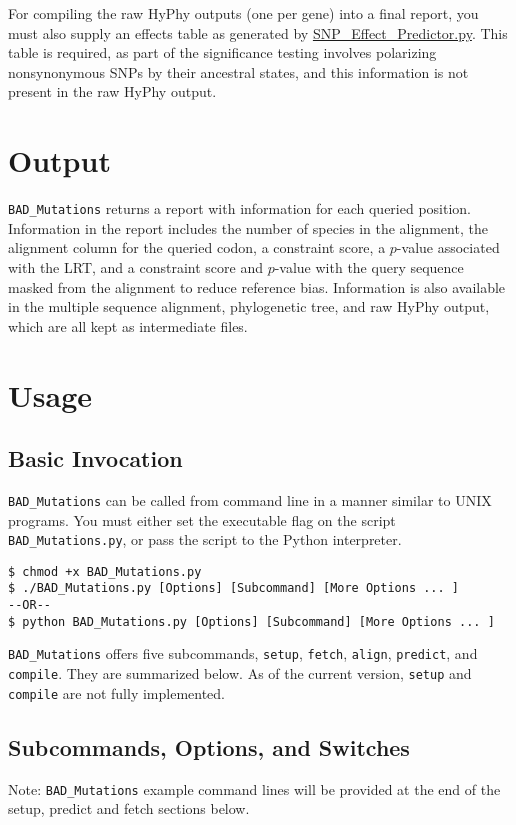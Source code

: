 \documentclass[12pt]{article}
\newcommand{\BM}{\texttt{BAD\_Mutations} }
\begin{document}
\par For compiling the raw HyPhy outputs (one per gene) into a final report,
you must also supply an effects table as generated by
\href{https://raw.githubusercontent.com/TomJKono/Misc_Utils/master/SNP_Effect_Predictor.py}
{SNP\_Effect\_Predictor.py}.
This table is required, as part of the significance testing involves polarizing
nonsynonymous SNPs by their ancestral states, and this information is not
present in the raw HyPhy output.

\section*{Output}
\par \BM returns a report with information for each queried position.
Information in the report includes the number of species in the alignment,
the alignment column for the queried codon, a constraint score, a $p$-value
associated with the LRT, and a constraint score and $p$-value with the query
sequence masked from the alignment to reduce reference bias. Information is
also available in the multiple sequence alignment, phylogenetic tree, and raw
HyPhy output, which are all kept as intermediate files.

\section*{Usage}
\subsection*{Basic Invocation}
\par \BM can be called from command line in a manner similar to UNIX programs.
You must either set the executable flag on the script \texttt{BAD\_Mutations.py},
or pass the script to the Python interpreter.
\begin{Verbatim}[frame=single, fontsize=\small, rulecolor=\color{gray}]
$ chmod +x BAD_Mutations.py
$ ./BAD_Mutations.py [Options] [Subcommand] [More Options ... ]
--OR--
$ python BAD_Mutations.py [Options] [Subcommand] [More Options ... ]
\end{Verbatim}
\par \BM offers five subcommands, \texttt{setup}, \texttt{fetch},
\texttt{align}, \texttt{predict}, and \texttt{compile}. They are summarized
below. As of the current version, \texttt{setup} and \texttt{compile} are not
fully implemented.

\subsection*{Subcommands, Options, and Switches}
\par Note: \BM example command lines will be provided at the end of the setup,
predict and fetch sections below.
\end{document}
